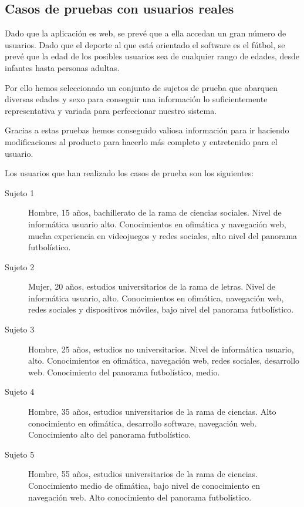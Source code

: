 
\subsection{Casos de pruebas con usuarios reales}
Dado que la aplicación es web, se prevé que a ella accedan un gran número de
usuarios. Dado que el deporte al que está orientado el software es el fútbol, se
prevé que la edad de los posibles usuarios sea de cualquier rango de edades,
desde infantes hasta personas adultas.

Por ello hemos seleccionado un conjunto de sujetos de prueba que abarquen
diversas edades y sexo para conseguir una información lo suficientemente
representativa y variada para perfeccionar nuestro sistema.

Gracias a estas pruebas hemos conseguido valiosa información para ir haciendo
modificaciones al producto para hacerlo más completo y entretenido para el
usuario.

Los usuarios que han realizado los casos de prueba son los siguientes:

\begin{description}
\item[Sujeto 1] Hombre, 15 años, bachillerato de la rama de ciencias
  sociales. Nivel de informática usuario alto. Conocimientos en ofimática y
  navegación web, mucha experiencia en videojuegos y redes sociales, alto nivel
  del panorama futbolístico.
\item[Sujeto 2] Mujer, 20 años, estudios universitarios de la rama de
  letras. Nivel de informática usuario, alto. Conocimientos en ofimática,
  navegación web, redes sociales y dispositivos móviles, bajo nivel del panorama
  futbolístico.
\item[Sujeto 3] Hombre, 25 años, estudios no universitarios. Nivel de
  informática usuario, alto. Conocimientos en ofimática, navegación web, redes
  sociales, desarrollo web. Conocimiento del panorama futbolístico, medio.
\item[Sujeto 4] Hombre, 35 años, estudios universitarios de la rama de
  ciencias. Alto conocimiento en ofimática, desarrollo software, navegación
  web. Conocimiento alto del panorama futbolístico.
\item[Sujeto 5] Hombre, 55 años, estudios universitarios de la rama de
  ciencias. Conocimiento medio de ofimática, bajo nivel de conocimiento en
  navegación web. Alto conocimiento del panorama futbolístico.
\end{description}

